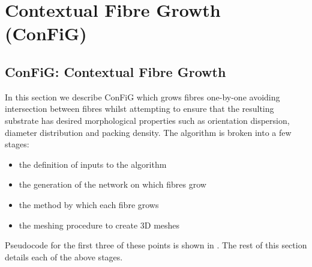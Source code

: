 \chapter{Contextual Fibre Growth (ConFiG)}
\label{sec:config}




\section{ConFiG: Contextual Fibre Growth}
\label{sec:fibre_growth_algorithm}
In this section we describe ConFiG  which grows fibres one-by-one avoiding intersection between fibres whilst attempting to ensure that the resulting substrate has desired morphological properties such as orientation dispersion, diameter distribution and packing density.
The algorithm is broken into a few stages:
\begin{itemize}
\item the definition of inputs to the algorithm
\item the generation of the network on which fibres grow
\item the method by which each fibre grows
\item the meshing procedure to create 3D meshes
\end{itemize}
Pseudocode for the first three of these points is shown in . The rest of this section details each of the above stages.

